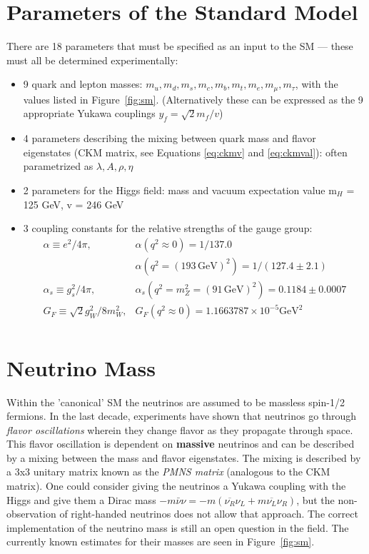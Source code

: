 \section{Parameters of the Standard Model}

There are 18 parameters that must be specified as an input to the SM --- these must all be determined experimentally:

\begin{itemize}
\item 9 quark and lepton masses: $m_{u}, m_{d}, m_{s}, m_{c}, m_{b}, m_{t}, m_{e}, m_{\mu}, m_{\tau}$, with the values listed in Figure~\ref{fig:sm}. (Alternatively these can be expressed as the 9 appropriate Yukawa couplings $y_{f}=\sqrt{2}m_{f} / v$)
\item 4 parameters describing the mixing between quark mass and flavor eigenstates (CKM matrix, see Equations \ref{eq:ckmv} and \ref{eq:ckmval}): often parametrized as $\lambda, A, \rho, \eta$
\item 2 parameters for the Higgs field: mass and vacuum expectation value m$_{H}$ = 125 GeV, v = 246 GeV 
\item 3 coupling constants for the relative strengths of the gauge group:
\begin{equation*}
\begin{array}{ll}
\alpha \equiv e^{2} / 4 \pi, & \alpha(q^{2} \approx 0) = 1 / 137.0 \\
 & \alpha(q^{2} = (193\,\mathrm{GeV})^{2}) = 1 / (127.4\pm 2.1)\\
\alpha_{s} \equiv g_{s}^{2} / 4 \pi,  & \alpha_{s}(q^{2}=m_{Z}^{2} = (91\,\mathrm{GeV})^{2})= 0.1184 \pm 0.0007\\
G_{F} \equiv \sqrt{2} g^{2}_{W} / 8 m_{W}^{2}, & G_{F} (q^{2}\approx0) = 1.1663787\times10^{-5} \textrm{GeV}^{2}\\

\end{array}
\end{equation*}
\end{itemize}

\section{Neutrino Mass}

Within the 'canonical' SM the neutrinos are assumed to be massless spin-1/2 fermions. In the last decade, experiments have shown that neutrinos go through \textit{flavor oscillations} wherein they change flavor as they propagate through space. This flavor oscillation is dependent on \textbf{massive} neutrinos and can be described by a mixing between the mass and flavor eigenstates. The mixing is described by a 3x3 unitary matrix known as the \textit{PMNS matrix} (analogous to the CKM matrix). One could consider giving the neutrinos a Yukawa coupling with the Higgs and give them a Dirac mass $-m\bar{\nu}\nu = -m(\overline{\nu_{R}}\nu_{L} + m\overline{\nu_{L}}\nu_{R})$, but the non-observation of right-handed neutrinos does not allow that approach. The correct implementation of the neutrino mass is still an open question in the field. The currently known estimates for their masses are seen in Figure~\ref{fig:sm}.

